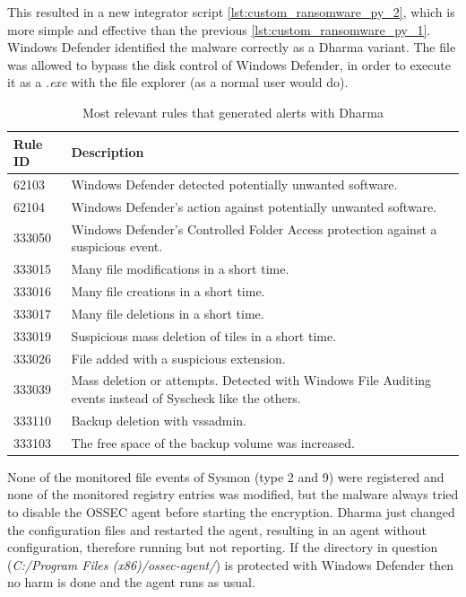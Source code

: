 \linej
This resulted in a new integrator script \ref{lst:custom_ransomware_py_2}, which is more simple and effective than the previous \ref{lst:custom_ransomware_py_1}.
\linej
\linej
Windows Defender identified the malware correctly as a Dharma variant.
The file was allowed to bypass the disk control of Windows Defender, in order to execute it as a \textit{.exe} with the file explorer (as a normal user would do).
\linej
\begin{table}[H]
	\begin{tabularx}{\textwidth}{|l|X|}
		\hline
		\rowcolor{gray!30}
		Rule ID & Description \\ \hline
		62103 & Windows Defender detected potentially unwanted software.\\ \hline
		62104 & Windows Defender's action against potentially unwanted software.\\ \hline
		333050 & Windows Defender's Controlled Folder Access protection against a suspicious event.\\ \hline
		333015 & Many file modifications in a short time.\\ \hline
		333016 & Many file creations in a short time.\\ \hline
		333017 & Many file deletions in a short time.\\ \hline
		333019 & Suspicious mass deletion of tiles in a short time.\\ \hline
		333026 & File added with a suspicious extension.\\ \hline
		333039 & Mass deletion or attempts. Detected with Windows File Auditing events instead of Syscheck like the others.\\ \hline
		333110 & Backup deletion with vssadmin.\\ \hline
		333103 & The free space of the backup volume was increased.\\ \hline
	\end{tabularx}
	\caption{Most relevant rules that generated alerts with Dharma}
\end{table}
\linej
None of the monitored file events of Sysmon (type 2 and 9) were registered and none of the monitored registry entries was modified, but the malware always tried to disable the OSSEC agent before starting the encryption.
Dharma just changed the configuration files and restarted the agent, resulting in an agent without configuration, therefore running but not reporting.
If the directory in question (\textit{C:/Program Files (x86)/ossec-agent/}) is protected with Windows Defender then no harm is done and the agent runs as usual.
